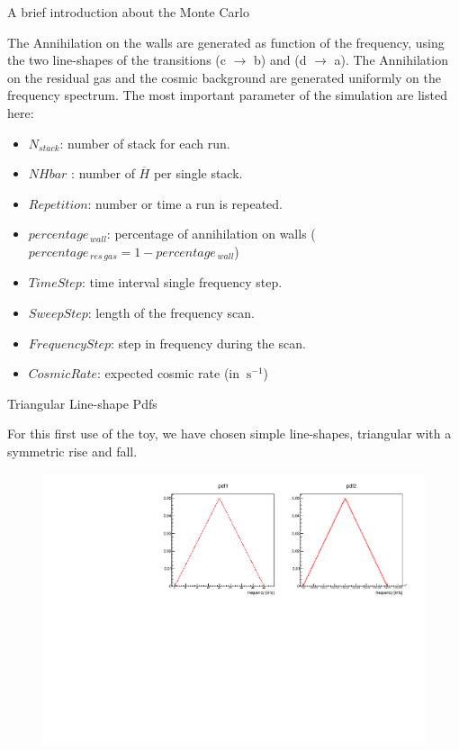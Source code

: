 \documentclass[8pt]{beamer}
\begin{document}
\begin{frame}{A brief introduction about the Monte Carlo}

The Annihilation on the walls are generated as function of the frequency, using the two line-shapes of the transitions (c $\rightarrow$ b) and (d $\rightarrow$ a). The Annihilation on the residual gas and the cosmic background are generated uniformly on the frequency spectrum. The most important parameter of the simulation are listed here:

\begin{itemize}
\item $N_{stack}$: number of stack for each run.
\item $NHbar$ : number of $\overline{H}$ per single stack.
\item $Repetition$: number or time a run is repeated.
\item $percentage_{\, wall}$: percentage of annihilation on walls ($percentage_{\, res \, gas} = 1 - percentage_{\, wall}$)
\item $TimeStep$: time interval single frequency step.
\item $SweepStep$: length of the frequency scan.
\item $FrequencyStep$: step in frequency during the scan.
\item $CosmicRate$: expected cosmic rate (in $\SI{}{\second \tothe{-1}}$)
\end{itemize}

\end{frame}

\begin{frame}{Triangular Line-shape Pdfs}

For this first use of the toy, we have chosen simple line-shapes, triangular with a symmetric rise and fall.

\begin{figure}
\centering
\includegraphics[width = \textwidth]{../Plot/Pdf1Pdf2.pdf}
\end{figure}

\end{frame}
\end{document}
